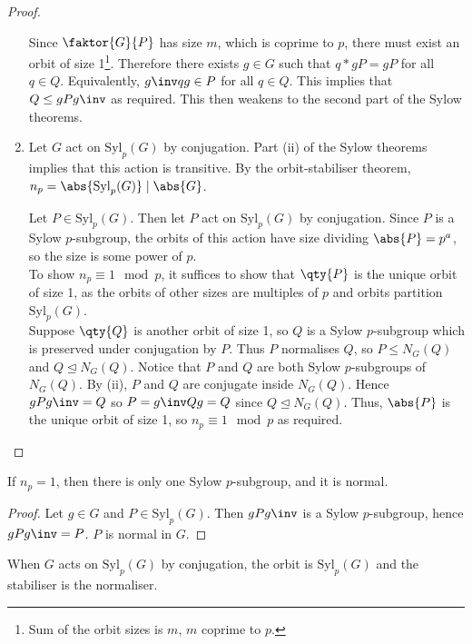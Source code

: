 \begin{proof}
\begin{enumerate}
		      Since $\faktor{G}{P}$ has size $m$, which is coprime to $p$, there must exist an orbit of size 1\footnote{Sum of the orbit sizes is $m$, $m$ coprime to $p$.}.
		      Therefore there exists $g \in G$ such that $q \ast gP = gP$ for all $q \in Q$.
		      Equivalently, $g\inv q g \in P$ for all $q \in Q$.
		      This implies that $Q \leq gPg\inv$ as required.
		      This then weakens to the second part of the Sylow theorems.
		\item Let $G$ act on $\mathrm{Syl}_p(G)$ by conjugation.
		      Part (ii) of the Sylow theorems implies that this action is transitive.
		      By the orbit-stabiliser theorem, $n_p = \abs{\mathrm{Syl}_p(G)} \mid \abs{G}$.

		      Let $P \in \mathrm{Syl}_p(G)$.
		      Then let $P$ act on $\mathrm{Syl}_p(G)$ by conjugation.
		      Since $P$ is a Sylow $p$-subgroup, the orbits of this action have size dividing $\abs{P} = p^a$, so the size is some power of $p$. \\
		      To show $n_p \equiv 1 \mod p$, it suffices to show that $\qty{P}$ is the unique orbit of size 1, as the orbits of other sizes are multiples of $p$ and orbits partition $\mathrm{Syl}_p(G)$. \\
		      Suppose $\qty{Q}$ is another orbit of size 1, so $Q$ is a Sylow $p$-subgroup which is preserved under conjugation by $P$.
		      Thus $P$ normalises $Q$, so $P \leq N_G(Q)$ and $Q \trianglelefteq N_G(Q)$.
		      Notice that $P$ and $Q$ are both Sylow $p$-subgroups of $N_G(Q)$.
		      By (ii), $P$ and $Q$ are conjugate inside $N_G(Q)$.
		      Hence $gPg\inv = Q$ so $P = g\inv Q g = Q$ since $Q \trianglelefteq N_G(Q)$.
		      Thus, $\abs{P}$ is the unique orbit of size 1, so $n_p \equiv 1 \mod p$ as required.
	\end{enumerate}
\end{proof}

\begin{corollary}
	If $n_p = 1$, then there is only one Sylow $p$-subgroup, and it is normal.
\end{corollary}

\begin{proof}
	Let $g \in G$ and $P \in \mathrm{Syl}_p(G)$.
	Then $g P g\inv$ is a Sylow $p$-subgroup, hence $g P g\inv = P$.
	$P$ is normal in $G$.
\end{proof}

\begin{remark}
	When $G$ acts on $\mathrm{Syl}_p(G)$ by conjugation, the orbit is $\mathrm{Syl}_p(G)$ and the stabiliser is the normaliser.  
\end{remark}

